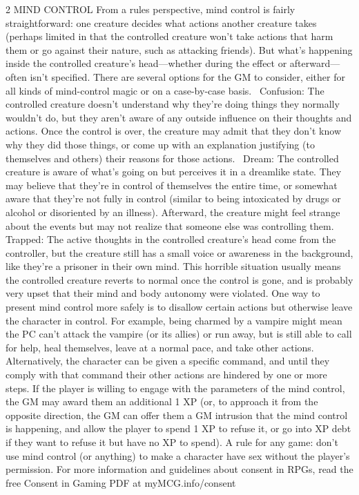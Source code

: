 \begin{multicols}{2}
MIND CONTROL
From a rules perspective, mind control is fairly straightforward: one creature decides what actions another creature takes (perhaps limited in that the controlled creature won’t take actions that harm them or go against their nature, such as attacking friends). But what’s happening inside the controlled creature’s head—whether during the effect or afterward—often isn’t specified. There are several options for the GM to consider, either for all kinds of mind-control magic or on a case-by-case basis. 
Confusion: The controlled creature doesn’t understand why they’re doing things they normally wouldn’t do, but they aren’t aware of any outside influence on their thoughts and actions. Once the control is over, the creature may admit that they don’t know why they did those things, or come up with an explanation justifying (to themselves and others) their reasons for those actions. 
Dream: The controlled creature is aware of what’s going on but perceives it in a dreamlike state. They may believe that they’re in control of themselves the entire time, or somewhat aware that they’re not fully in control (similar to being intoxicated by drugs or alcohol or disoriented by an illness). Afterward, the creature might feel strange about the events but may not realize that someone else was controlling them. 
Trapped: The active thoughts in the controlled creature’s head come from the controller, but the creature still has a small voice or awareness in the background, like they’re a prisoner in their own mind. This horrible situation usually means the controlled creature reverts to normal once the control is gone, and is probably very upset that their mind and body autonomy were violated.
One way to present mind control more safely is to disallow certain actions but otherwise leave the character in control. For example, being charmed by a vampire might mean the PC can’t attack the vampire (or its allies) or run away, but is still able to call for help, heal themselves, leave at a normal pace, and take other actions. Alternatively, the character can be given a specific command, and until they comply with that command their other actions are hindered by one or more steps. If the player is willing to engage with the parameters of the mind control, the GM may award them an additional 1 XP (or, to approach it from the opposite direction, the GM can offer them a GM intrusion that the mind control is happening, and allow the player to spend 1 XP to refuse it, or go into XP debt if they want to refuse it but have no XP to spend).
	A rule for any game: don’t use mind control (or anything) to make a character have sex without the player’s permission. For more information and guidelines about consent in RPGs, read the free Consent in Gaming PDF at myMCG.info/consent

\end{multicols}
